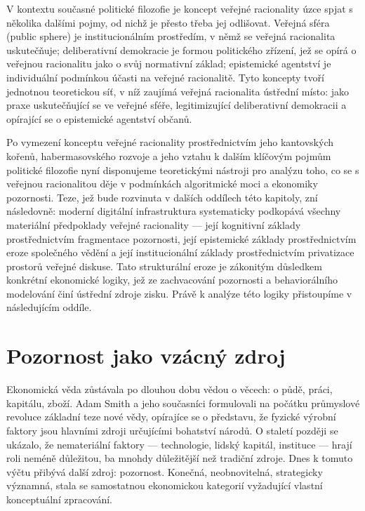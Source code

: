 V kontextu současné politické filozofie je koncept veřejné racionality úzce spjat s několika dalšími pojmy, od nichž je přesto třeba jej odlišovat. Veřejná sféra (public sphere) je institucionálním prostředím, v němž se veřejná racionalita uskutečňuje; deliberativní demokracie je formou politického zřízení, jež se opírá o veřejnou racionalitu jako o svůj normativní základ;
epistemické agentství je individuální podmínkou účasti na veřejné racionalitě.
Tyto koncepty tvoří jednotnou teoretickou síť, v níž zaujímá veřejná racionalita ústřední místo: jako praxe uskutečňující se ve veřejné sféře, legitimizující deliberativní demokracii a opírající se o epistemické agentství občanů.



Po vymezení konceptu veřejné racionality prostřednictvím jeho kantovských kořenů, habermasovského rozvoje a jeho vztahu k dalším klíčovým pojmům politické filozofie nyní disponujeme teoretickými nástroji pro analýzu toho, co se s veřejnou racionalitou děje v podmínkách algoritmické moci a ekonomiky pozornosti.
Teze, jež bude rozvinuta v dalších oddílech této kapitoly, zní následovně: moderní digitální infrastruktura systematicky podkopává všechny materiální předpoklady veřejné racionality — její kognitivní základy prostřednictvím fragmentace pozornosti, její epistemické základy prostřednictvím eroze společného vědění a její institucionální základy prostřednictvím privatizace prostorů veřejné diskuse.
Tato strukturální eroze je zákonitým důsledkem konkrétní ekonomické logiky, jež ze zachvacování pozornosti a behaviorálního modelování činí ústřední zdroje zisku. Právě k analýze této logiky přistoupíme v následujícím oddíle.

\section{Pozornost jako vzácný zdroj}


Ekonomická věda zůstávala po dlouhou dobu vědou o věcech: o půdě, práci, kapitálu, zboží.
Adam Smith a jeho současníci formulovali na počátku průmyslové revoluce základní teze nové vědy, opírajíce se o představu, že fyzické výrobní faktory jsou hlavními zdroji určujícími bohatství národů.
O staletí později se ukázalo, že nemateriální faktory — technologie, lidský kapitál, instituce — hrají roli neméně důležitou, ba mnohdy důležitější než tradiční zdroje.
Dnes k tomuto výčtu přibývá další zdroj: pozornost.
Konečná, neobnovitelná, strategicky významná, stala se samostatnou ekonomickou kategorií vyžadující vlastní konceptuální zpracování.

